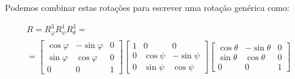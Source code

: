 \documentclass{beamer}
\begin{document}
\begin{frame}
  Podemos combinar estas rotações para escrever uma rotação genérica como:

  \begin{gather*}
    R =R_\varphi^3R_\psi^1 R_\theta^3= \\
   = \begin{bmatrix}
     \cos\varphi & -\sin\varphi & 0 \\
     \sin\varphi & \cos\varphi & 0 \\
     0 & 0 & 1 
    \end{bmatrix}\begin{bmatrix}
      1 & 0 & 0 \\
      0 & \cos\psi & -\sin\psi \\
      0 & \sin\psi & \cos\psi
    \end{bmatrix}\begin{bmatrix}
      \cos\theta & -\sin\theta & 0 \\
      \sin\theta & \cos\theta & 0 \\
      0 & 0 & 1
    \end{bmatrix}
  \end{gather*}
\end{frame}
\end{document}
